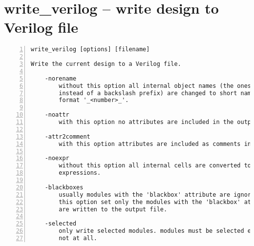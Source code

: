 \section{write\_verilog -- write design to Verilog file}
\label{cmd:write_verilog}
\begin{lstlisting}[numbers=left,frame=single]
    write_verilog [options] [filename]

Write the current design to a Verilog file.

    -norename
        without this option all internal object names (the ones with a dollar
        instead of a backslash prefix) are changed to short names in the
        format '_<number>_'.

    -noattr
        with this option no attributes are included in the output

    -attr2comment
        with this option attributes are included as comments in the output

    -noexpr
        without this option all internal cells are converted to Verilog
        expressions.

    -blackboxes
        usually modules with the 'blackbox' attribute are ignored. with
        this option set only the modules with the 'blackbox' attribute
        are written to the output file.

    -selected
        only write selected modules. modules must be selected entirely or
        not at all.
\end{lstlisting}

